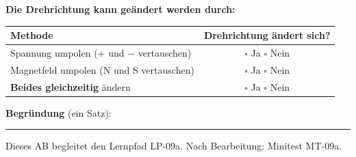 \documentclass[11pt, a4paper]{article}
\begin{document}
\begin{merkkasten}

\textbf{Die Drehrichtung kann geändert werden durch:}

\vspace{2mm}
\begin{tabularx}{\textwidth}{|X|c|}
\hline
\textbf{Methode} & \textbf{Drehrichtung ändert sich?} \\
\hline
Spannung umpolen (+ und $-$ vertauschen) & $\square$ Ja \quad $\square$ Nein \\
\hline
Magnetfeld umpolen (N und S vertauschen) & $\square$ Ja \quad $\square$ Nein \\
\hline
\textbf{Beides gleichzeitig} ändern & $\square$ Ja \quad $\square$ Nein \\
\hline
\end{tabularx}

\vspace{3mm}
\textbf{Begründung} (ein Satz):

\vspace{2mm}
\rule{\linewidth}{0.3pt}

\end{merkkasten}


\vfill

\begin{center}
\small\textcolor{mittelgrau}{Dieses AB begleitet den Lernpfad LP-09a. Nach Bearbeitung: Minitest MT-09a.}
\end{center}
\end{document}

